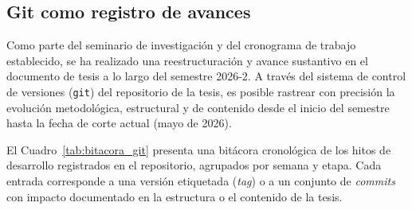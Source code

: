 \subsection{Git como registro de avances}
\label{ssec:git-avances}

Como parte del seminario de investigación y del cronograma de trabajo establecido,
se ha realizado una reestructuración y avance sustantivo en el documento de tesis
a lo largo del semestre 2026-2. A través del sistema de control de versiones
(\texttt{git}) del repositorio de la tesis, es posible rastrear con precisión
la evolución metodológica, estructural y de contenido desde el inicio del semestre
hasta la fecha de corte actual (mayo de 2026).

El Cuadro~\ref{tab:bitacora_git} presenta una bitácora cronológica de los hitos
de desarrollo registrados en el repositorio, agrupados por semana y etapa. Cada
entrada corresponde a una versión etiquetada (\textit{tag}) o a un conjunto de
\textit{commits} con impacto documentado en la estructura o el contenido de la tesis.

